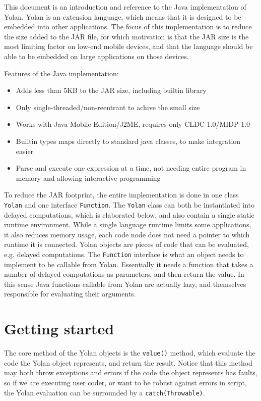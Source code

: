 This document is an introduction and reference to the Java implementation of Yolan.
Yolan is an extension language, which means that it is designed to be embedded into other applications.
The focus of this implementation is to reduce the size added to the JAR file, for which motivation is that the JAR size is the most limiting factor on low-end mobile devices, and that the language should be able to be embedded on large applications on those devices.

Features of the Java implementation:
\begin{itemize}
\item Adds less than 5KB to the JAR size, including builtin library
\item Only single-threaded/non-reentrant to achive the small size
\item Works with Java Mobile Edition/J2ME, requires only CLDC 1.0/MIDP 1.0
\item Builtin types maps directly to standard java classes, to make integration easier
\item Parse and execute one expression at a time, not needing entire program in memory and allowing interactive programming 
\end{itemize}

To reduce the JAR footprint, the entire implementation is done in one class \verb|Yolan| and one interface \verb|Function|. 
The \verb|Yolan| class can both be instantiated into delayed computations, which is elaborated below, and also contain a single static runtime environment. While a single language runtime limits some applications, it also reduces memory usage, each code node does not need a pointer to which runtime it is connected. 
Yolan objects are pieces of code that can be evaluated, e.g. delayed computations.
The \verb|Function| interface is what an object needs to implement to be callable from Yolan. Essentially it needs a function that takes a number of delayed computations as parameters, and then return the value. In this sense Java functions callable from Yolan are actually lazy, and themselves responsible for evaluating their arguments.

\section{Getting started}

The core method of the Yolan objects is the \verb|value()| method, which evaluate the code the Yolan object represents, and return the result.
Notice that this method may both throw exceptions and errors if the code the object represents has faults, so if we are executing user coder, or want to be robust against errors in script, the Yolan evaluation can be surrounded by a \verb|catch(Throwable)|.

